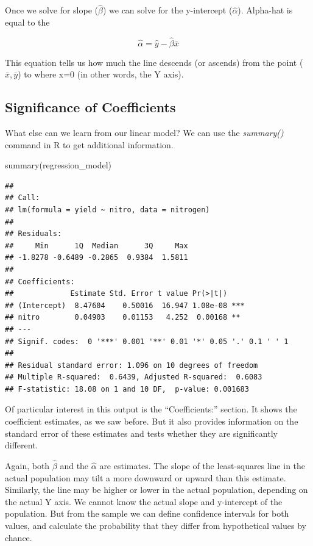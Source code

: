\documentclass[
]{book}
\newenvironment{Shaded}{\begin{snugshade}}{\end{snugshade}}
\newcommand{\FunctionTok}[1]{\textcolor[rgb]{0.00,0.00,0.00}{#1}}
\newcommand{\NormalTok}[1]{#1}
\begin{document}
Once we solve for slope (\(\hat{\beta}\)) we can solve for the y-intercept (\(\hat{\alpha}\)). Alpha-hat is equal to the

\[\hat{\alpha} = \hat{y} - \hat{\beta}\bar{x} \]

This equation tells us how much the line descends (or ascends) from the point (\(\bar{x}, \bar{y}\)) to where x=0 (in other words, the Y axis).

\hypertarget{significance-of-coefficients}{%
\subsection{Significance of Coefficients}\label{significance-of-coefficients}}

What else can we learn from our linear model? We can use the \emph{summary()} command in R to get additional information.

\begin{Shaded}
\begin{Highlighting}[]
\FunctionTok{summary}\NormalTok{(regression\_model)}
\end{Highlighting}
\end{Shaded}

\begin{verbatim}
## 
## Call:
## lm(formula = yield ~ nitro, data = nitrogen)
## 
## Residuals:
##     Min      1Q  Median      3Q     Max 
## -1.8278 -0.6489 -0.2865  0.9384  1.5811 
## 
## Coefficients:
##             Estimate Std. Error t value Pr(>|t|)    
## (Intercept)  8.47604    0.50016  16.947 1.08e-08 ***
## nitro        0.04903    0.01153   4.252  0.00168 ** 
## ---
## Signif. codes:  0 '***' 0.001 '**' 0.01 '*' 0.05 '.' 0.1 ' ' 1
## 
## Residual standard error: 1.096 on 10 degrees of freedom
## Multiple R-squared:  0.6439, Adjusted R-squared:  0.6083 
## F-statistic: 18.08 on 1 and 10 DF,  p-value: 0.001683
\end{verbatim}

Of particular interest in this output is the ``Coefficients:'' section. It shows the coefficient estimates, as we saw before. But it also provides information on the standard error of these estimates and tests whether they are significantly different.

Again, both \(\hat{\beta}\) and the \(\hat{\alpha}\) are estimates. The slope of the least-squares line in the actual population may tilt a more downward or upward than this estimate. Similarly, the line may be higher or lower in the actual population, depending on the actual Y axis. We cannot know the actual slope and y-intercept of the population. But from the sample we can define confidence intervals for both values, and calculate the probability that they differ from hypothetical values by chance.
\end{document}
